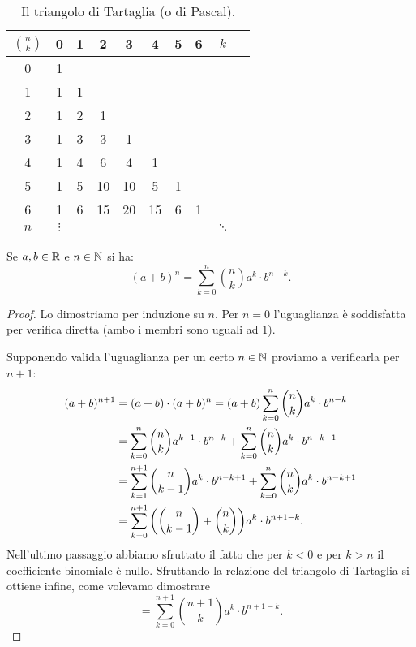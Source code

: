 \begin{table}
\begin{tabular}{c|ccccccccc}
$\displaystyle{n \choose k}$& 0 & 1 & 2 & 3 & 4 & 5 & 6 & $k$ &\\ \hline
  0 & 1 &   &   &   &   &   &   & &\\
  1 & 1 & 1 &   &   &   &   &   & &\\
  2 & 1 & 2 & 1 &   &   &   &   & &\\
  3 & 1 & 3 & 3 & 1 &   &   &   & &\\
  4 & 1 & 4 & 6 & 4 & 1 &   &   & &\\
  5 & 1 & 5 & 10& 10& 5 & 1 &   & &\\
  6 & 1 & 6 & 15& 20& 15& 6 & 1 & &\\
$n$ &$\vdots$&&   &   &   &   &   & $\ddots$ &
\end{tabular}
\caption{Il triangolo di Tartaglia (o di Pascal).}
\label{tab:binomiali}
\end{table}

\begin{theorem}
\label{th:sviluppo_binomiale}%
\mymark{***}%
Se $a,b\in \mathbb R$ e $n\in \mathbb N$ si ha:
\begin{equation}
\label{eq:sviluppo_binomiale}
(a+b)^n = \sum_{k=0}^n {n \choose k} a^k \cdot b^{n-k}.
\end{equation}
\end{theorem}
%
\begin{proof}
Lo dimostriamo per induzione su $n$.
Per $n=0$ l'uguaglianza è soddisfatta per verifica diretta (ambo i membri sono uguali ad $1$).

Supponendo valida l'uguaglianza per un certo $n\in \mathbb N$ proviamo a verificarla
per $n+1$:
\begin{align*}
(a+b)^{n+1}
&= (a+b)\cdot (a+b)^n
 = (a+b) \sum_{k=0}^n {n \choose k} a^k \cdot b^{n-k}\\
&= \sum_{k=0}^n {n \choose k} a^{k+1}\cdot b^{n-k}
   + \sum_{k=0}^n {n \choose k} a^k \cdot b^{n-k+1} \\
&= \sum_{k=1}^{n+1} {n \choose k-1} a^k \cdot b^{n-k+1}
   + \sum_{k=0}^n {n \choose k}a^k \cdot b^{n-k+1} \\
&= \sum_{k=0}^{n+1} {\left( {n \choose k-1} + {n \choose k} \right)} a^k \cdot b^{n+1-k}.
\end{align*}
Nell'ultimo passaggio abbiamo sfruttato il fatto che per $k<0$ e per $k>n$ il coefficiente binomiale è nullo.
Sfruttando la relazione del triangolo di Tartaglia si ottiene infine,
come volevamo dimostrare
\[
  = \sum_{k=0}^{n+1}{n+1 \choose k} a^k \cdot b^{n+1-k}.
\]
\end{proof}

